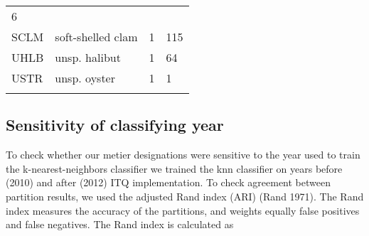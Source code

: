 \documentclass[]{article}
\begin{document}
\begin{longtable}[c]{@{}llll@{}}
\begin{minipage}[t]{0.23\columnwidth}
6
\end{minipage}
\\\addlinespace
\begin{minipage}[t]{0.08\columnwidth}\raggedright
SCLM
\end{minipage} & \begin{minipage}[t]{0.36\columnwidth}\raggedright
soft-shelled clam
\end{minipage} & \begin{minipage}[t]{0.21\columnwidth}\raggedright
1
\end{minipage} & \begin{minipage}[t]{0.23\columnwidth}\raggedright
115
\end{minipage}
\\\addlinespace
\begin{minipage}[t]{0.08\columnwidth}\raggedright
UHLB
\end{minipage} & \begin{minipage}[t]{0.36\columnwidth}\raggedright
unsp. halibut
\end{minipage} & \begin{minipage}[t]{0.21\columnwidth}\raggedright
1
\end{minipage} & \begin{minipage}[t]{0.23\columnwidth}\raggedright
64
\end{minipage}
\\\addlinespace
\begin{minipage}[t]{0.08\columnwidth}\raggedright
USTR
\end{minipage} & \begin{minipage}[t]{0.36\columnwidth}\raggedright
unsp. oyster
\end{minipage} & \begin{minipage}[t]{0.21\columnwidth}\raggedright
1
\end{minipage} & \begin{minipage}[t]{0.23\columnwidth}\raggedright
1
\end{minipage}
\\\addlinespace
\bottomrule
\end{longtable}

\subsection{Sensitivity of classifying
year}\label{sensitivity-of-classifying-year}

To check whether our metier designations were sensitive to the year used
to train the k-nearest-neighbors classifier we trained the knn
classifier on years before (2010) and after (2012) ITQ implementation.
To check agreement between partition results, we used the adjusted Rand
index (ARI) (Rand 1971). The Rand index measures the accuracy of the
partitions, and weights equally false positives and false negatives. The
Rand index is calculated as
\end{document}
